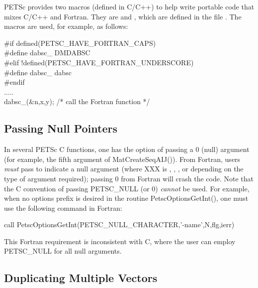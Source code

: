 PETSc provides two macros (defined in C/C++) to help write
portable code that mixes C/C++ and Fortran. They are
 and 
 ,
which are defined in the file .
The macros are used, for example, as follows:
\begin{tabbing}
   \#if defined(PETSC\_HAVE\_FORTRAN\_CAPS)\\
   \#define dabsc\_ DMDABSC\\
   \#elif !defined(PETSC\_HAVE\_FORTRAN\_UNDERSCORE)\\
   \#define dabsc\_ dabsc\\
   \#endif\\
   .....\\
   dabsc\_(\&n,x,y); /* call the Fortran function */
\end{tabbing}


\subsection{Passing Null Pointers}

In several PETSc C functions, one has the option of passing a 0 (null)
argument (for example, the fifth argument of MatCreateSeqAIJ()).
From Fortran, users {\em must} pass  to indicate a
null argument (where XXX is , , ,
or  depending on the type of argument required);
 passing  0 from
 Fortran   will crash
the code.   Note
that the C convention of passing PETSC\_NULL (or 0) {\em cannot}
be used.  For example, when no options prefix is desired in the
routine PetscOptionsGetInt(), one must use the following command in
Fortran:
\begin{tabbing}
    call PetscOptionsGetInt(PETSC\_NULL\_CHARACTER,'-name',N,flg,ierr)
\end{tabbing}

This Fortran requirement is inconsistent with C, where the
user can employ PETSC\_NULL for all null arguments.

\subsection{Duplicating Multiple Vectors}
\label{sec_fortvecd}

